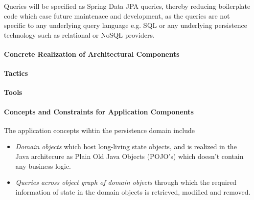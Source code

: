 Queries will be specified as Spring Data JPA queries, thereby reducing 
boilerplate code which ease future maintenace and development, as the queries
are not specific to any underlying query language e.g. SQL or any underlying 
persistence technology such as relational or NoSQL providers.

\paragraph{Concrete Realization of Architectural Components}
\paragraph{Tactics}
\paragraph{Tools}
\paragraph{Concepts and Constraints for Application Components}
The application concepts wihtin the persistence domain include
\begin{itemize}
	\item \textit{Domain objects} which host long-living state objects, and is realized in the Java architecure as Plain Old Java Objects (POJO's) which doesn't contain any business logic.
	\item \textit{Queries across object graph of domain objects} through which the required information of state in the domain objects is retrieved, modified and removed.
\end{itemize} 